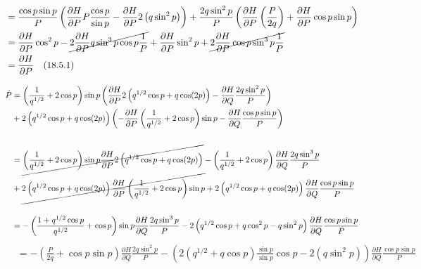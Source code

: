\documentclass[a4paper]{article}
\begin{document}
\begin{answer}[Punto 4]
\begin{itemize}
\begin{align*}
                &=  \frac{\cos p \sin p}{P} \left( \frac{\partial H}{\partial P}P\frac{\cos p}{\sin p} - \frac{\partial H}{\partial P} 2\left( q \sin^2 p \right)\right)+ \frac{2q \sin^2 p}{P} \left(\frac{\partial H}{\partial P} \left(\frac{P}{2q}  \right) + \frac{\partial H}{\partial P} \cos p\sin p\right)\\
                &=  \frac{\partial H}{\partial P}\cos^2 p - \cancel{2\frac{\partial H}{\partial P}q \sin^3 p \cos p \frac 1 P}+ \frac{\partial H}{\partial P} \sin^2 p + \cancel{2\frac{\partial H}{\partial P} \cos p\sin^3 p \frac 1P}\\
                &=  \frac{\partial H}{\partial P} \quad (18.5.1)\\
            \end{align*}

            \begin{align*}
                \dot P &= \left(\frac1{q^{1/2}} + 2\cos p\right)\sin p \left( \frac{\partial H}{\partial P} 2  \left( q^{1/2} \cos p + q \cos (2p) \right) - \frac{\partial H}{\partial Q} \frac{2q \sin^2 p}{P} \right)\\
                &+ 2 \left( q^{1/2} \cos p + q \cos (2p) \right) \left( -\frac{\partial H}{\partial P} \left(\frac1{q^{1/2}} + 2\cos p\right)\sin p - \frac{\partial H}{\partial Q} \frac{\cos p \sin p}{P} \right)\\\\
                &= \cancel{\left(\frac1{q^{1/2}} + 2\cos p\right)\sin p\frac{\partial H}{\partial P} 2  \left( q^{1/2} \cos p + q \cos (2p) \right)} - \left(\frac1{q^{1/2}} + 2\cos p\right) \frac{\partial H}{\partial Q} \frac{2q \sin^3 p}{P}\\
                &+ \cancel{2 \left( q^{1/2} \cos p + q \cos (2p) \right)\frac{\partial H}{\partial P} \left(\frac1{q^{1/2}} + 2\cos p\right)\sin p} + 2 \left( q^{1/2} \cos p + q \cos (2p) \right) \frac{\partial H}{\partial Q} \frac{\cos p \sin p}{P} \\\\
                &= - \left(\frac{1 + q^{1/2}\cos p}{q^{1/2}} + \cos p\right)\sin p \frac{\partial H}{\partial Q} \frac{2q \sin^3 p}{P} - 2 \left( q^{1/2} \cos p + q \cos^2 p - q \sin^2 p \right) \frac{\partial H}{\partial Q} \frac{\cos p \sin p}{P} \\
            \end{align*}
            \begin{align*}
                &= - \left(\frac {P}{2q} + \cos p\sin p\right) \frac{\partial H}{\partial Q} \frac{2q \sin^2 p}{P} -  \left( 2 \left( q^{1/2}  + q \cos p\right)\frac{\sin p}{\sin p}\cos p -2\left( q \sin^2 p \right)\right) \frac{\partial H}{\partial Q} \frac{\cos p \sin p}{P} \\

\end{align*}
\end{itemize}
\end{answer}
\end{document}
